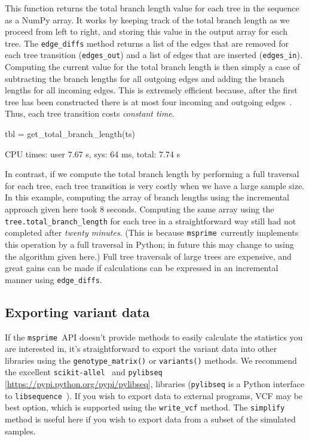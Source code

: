 \documentclass[graybox]{svmult}
\newcommand{\msprime}[0]{\texttt{msprime}}
\begin{document}
    This function returns the total branch length value for each tree in the
sequence as a NumPy array. It works by keeping track of the total branch
length as we proceed from left to right, and storing this value in the
output array for each tree. The \texttt{edge\_diffs} method returns a
list of the edges that are removed for each tree transition
(\texttt{edges\_out}) and a list of edges that are inserted
(\texttt{edges\_in}). Computing the current value for the total branch
length is then simply a case of subtracting the branch lengths for all
outgoing edges and adding the branch lengths for all incoming edges.
This is extremely efficient because, after the first tree has been
constructed there is at most four incoming and outgoing edges~\citep{kelleher2016efficient}. Thus,
each tree transition costs \emph{constant time}.

\begin{pythoncode}
tbl = get_total_branch_length(ts)

CPU times: user 7.67 s, sys: 64 ms, total: 7.74 s
\end{pythoncode}

In contrast, if we compute the total branch length by performing a
full traversal for each tree, each tree transition is very costly
when we have a large sample size. In this example, computing the array of branch lengths
using the incremental approach given here took 8 seconds. Computing the
same array using the \texttt{tree.total\_branch\_length} for each tree
in a straightforward way still had not completed after \emph{twenty
minutes}. (This is because \msprime\ currently implements this operation
by a full traversal in Python; in future this may change to using the
algorithm given here.) Full tree traversals of large trees are
expensive, and great gains can be made if calculations can be expressed
in an incremental manner using \texttt{edge\_diffs}.


\subsection{Exporting variant data}\label{exporting-variant-data}

If the \msprime\ API doesn't provide methods to easily calculate the
statistics you are interested in, it's straightforward to export the
variant data into other libraries using the \texttt{genotype\_matrix()}
or \texttt{variants()} methods. We recommend the excellent
\texttt{scikit-allel}~\citep{miles2017scikit} and
\texttt{pylibseq} [\url{https://pypi.python.org/pypi/pylibseq}],
libraries (\texttt{pylibseq} is a Python interface to
\texttt{libsequence}~\citep{thornton2003libsequence}). If you wish to export data to
external programs, VCF may be best option, which is supported using the
\texttt{write\_vcf} method. The \texttt{simplify} method is useful here
if you wish to export data from a subset of the simulated samples.
\end{document}
